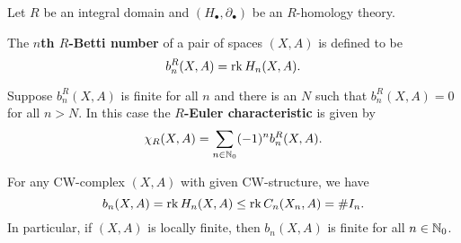 	\begin{definition}
		Let $R$ be an integral domain and $(H_\bullet, \partial_\bullet)$ be an $R$-homology theory.

		The \textbf{$n$th $R$-Betti number} of a pair of spaces $(X,A)$ is defined to be
		\begin{equation*}
			b_n^R (X,A) = \operatorname{rk} H_n(X,A).
		\end{equation*}

		Suppose $b_n^R(X,A)$ is finite for all $n$ and there is an $N$ such that $b_n^R(X,A) = 0$ for all $n > N$. In this case the \textbf{$R$-Euler characteristic} is given by
		\begin{equation*}
			\chi_R(X,A) = \sum \limits_{n \in \mathbb{N}_0} (-1)^n b_n^R(X,A).
		\end{equation*}
	\end{definition}

	\begin{remark}
		For any CW-complex $(X,A)$ with given CW-structure, we have  
		\begin{equation*}
			b_n(X,A) = \operatorname{rk} H_n(X,A) \leq \operatorname{rk} C_n(X_n,A) = \#I_n.
		\end{equation*}
		In particular, if $(X,A)$ is locally finite, then $b_n(X,A)$ is finite for all $n \in \mathbb{N}_0$.
	\end{remark}

